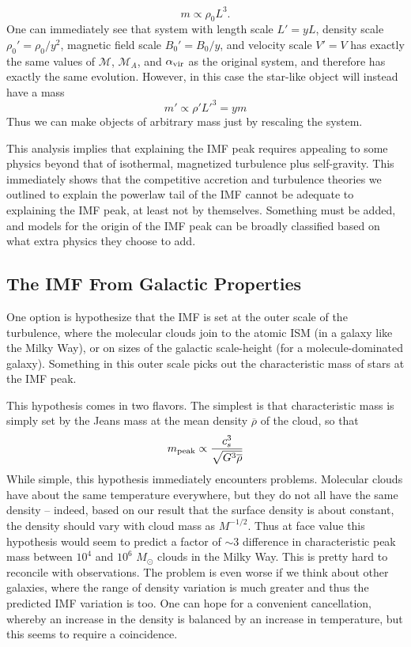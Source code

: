 \begin{equation}
m \propto \rho_0 L^3.
\end{equation}
One can immediately see that system with length scale $L' = y L$, density scale $\rho_0' = \rho_0 / y^2$, magnetic field scale $B_0' = B_0/y$, and velocity scale $V' = V$ has exactly the same values of $\mathcal{M}$, $\mathcal{M}_A$, and $\alpha_{\rm vir}$ as the original system, and therefore has exactly the same evolution. However, in this case the star-like object will instead have a mass
\begin{equation}
m' \propto \rho' L'^3 = y m
\end{equation}
Thus we can make objects of arbitrary mass just by rescaling the system.

This analysis implies that explaining the IMF peak requires appealing to some physics beyond that of isothermal, magnetized turbulence plus self-gravity. This immediately shows that the competitive accretion and turbulence theories we outlined to explain the powerlaw tail of the IMF cannot be adequate to explaining the IMF peak, at least not by themselves. Something must be added, and models for the origin of the IMF peak can be broadly classified based on what extra physics they choose to add.

\subsection{The IMF From Galactic Properties}

One option is hypothesize that the IMF is set at the outer scale of the turbulence, where the molecular clouds join to the atomic ISM (in a galaxy like the Milky Way), or on sizes of the galactic scale-height (for a molecule-dominated galaxy). Something in this outer scale picks out the characteristic mass of stars at the IMF peak.

This hypothesis comes in two flavors. The simplest is that characteristic mass is simply set by the Jeans mass at the mean density $\overline{\rho}$ of the cloud, so that
\begin{equation}
m_{\rm peak} \propto \frac{c_s^3}{\sqrt{G^3 \overline{\rho}}}
\end{equation}
While simple, this hypothesis immediately encounters problems. Molecular clouds have about the same temperature everywhere, but they do not all have the same density -- indeed, based on our result that the surface density is about constant, the density should vary with cloud mass as $M^{-1/2}$. Thus at face value this hypothesis would seem to predict a factor of $\sim 3$ difference in characteristic peak mass between $10^4$ and $10^6$ $M_\odot$ clouds in the Milky Way. This is pretty hard to reconcile with observations. The problem is even worse if we think about other galaxies, where the range of density variation is much greater and thus the predicted IMF variation is too. One can hope for a convenient cancellation, whereby an increase in the density is balanced by an increase in temperature, but this seems to require a coincidence.

